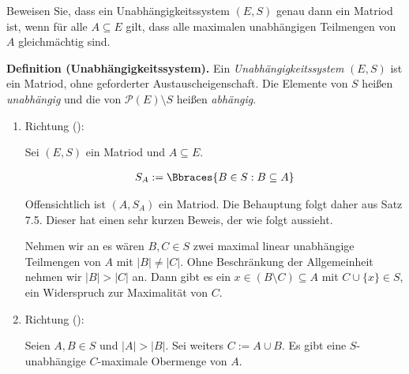 
\begin{exercise}

Beweisen Sie, dass ein Unabhängigkeitssystem $(E, S)$ genau dann ein Matriod ist, wenn für alle $A \subseteq E$ gilt, dass alle maximalen unabhängigen Teilmengen von $A$ gleichmächtig sind.

\end{exercise}


\begin{solution}

\phantom{}


\textbf{Definition (Unabhängigkeitssystem).}
Ein \textit{Unabhängigkeitssystem} $(E, S)$ ist ein Matriod, ohne geforderter Austauscheigenschaft.
Die Elemente von $S$ heißen \textit{unabhängig} und die von $\mathcal{P}(E) \setminus S$ heißen \textit{abhängig}.

\begin{enumerate}[label = \arabic*.]

    \item Richtung (\Quote{$\Rightarrow$}):


    Sei $(E, S)$ ein Matriod und $A \subseteq E$.

    \begin{align*}
        S_A := \Bbraces{B \in S: B \subseteq A}
    \end{align*}

    Offensichtlich ist $(A, S_A)$ ein Matriod.
    Die Behauptung folgt daher aus Satz 7.5. Dieser hat einen sehr kurzen Beweis, der wie folgt aussieht.
    
   	Nehmen wir an es wären $B,C \in S$ zwei maximal linear unabhängige Teilmengen von $A$ mit $|B| \neq |C|$. Ohne Beschränkung der Allgemeinheit nehmen wir $|B| > |C|$ an. Dann gibt es ein $x \in (B \setminus C) \subseteq A$  mit $C \cup \{x\} \in S$, ein Widerspruch zur Maximalität von $C$. 

    \item Richtung (\Quote{$\Leftarrow$}):
    
    Seien $A, B \in S$ und $|A| > |B|$.
    Sei weiters $C := A \cup B$.
    Es gibt eine $S$-unabhängige $C$-maximale Obermenge von $A$.


\end{enumerate}
\end{solution}
